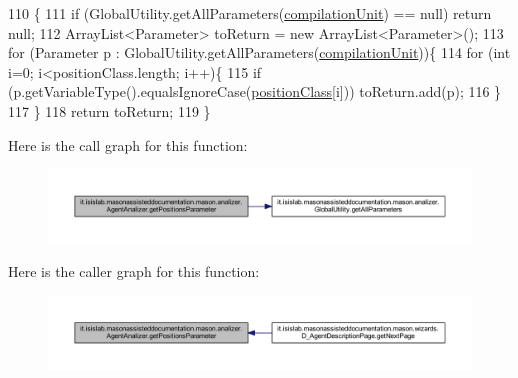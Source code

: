 \begin{DoxyCode}
110                                                        \{
111         \textcolor{keywordflow}{if} (GlobalUtility.getAllParameters(\hyperlink{classit_1_1isislab_1_1masonassisteddocumentation_1_1mason_1_1analizer_1_1_agent_analizer_aad9b5d0882694d2802dc24c982f21985}{compilationUnit}) == null) \textcolor{keywordflow}{return} null;
112         ArrayList<Parameter> toReturn = \textcolor{keyword}{new} ArrayList<Parameter>();
113         \textcolor{keywordflow}{for} (Parameter p : GlobalUtility.getAllParameters(\hyperlink{classit_1_1isislab_1_1masonassisteddocumentation_1_1mason_1_1analizer_1_1_agent_analizer_aad9b5d0882694d2802dc24c982f21985}{compilationUnit}))\{
114                 \textcolor{keywordflow}{for} (\textcolor{keywordtype}{int} i=0; i<positionClass.length; i++)\{
115                     \textcolor{keywordflow}{if} (p.getVariableType().equalsIgnoreCase(\hyperlink{classit_1_1isislab_1_1masonassisteddocumentation_1_1mason_1_1analizer_1_1_agent_analizer_aea5eff658e91428950dd0efd1339bf36}{positionClass}[i]))    
      toReturn.add(p);
116                 \}               
117         \}
118         \textcolor{keywordflow}{return} toReturn;
119     \}   
\end{DoxyCode}


Here is the call graph for this function\-:\nopagebreak
\begin{figure}[H]
\begin{center}
\leavevmode
\includegraphics[width=350pt]{classit_1_1isislab_1_1masonassisteddocumentation_1_1mason_1_1analizer_1_1_agent_analizer_a351c38491d7f706177c4c76478cabd6d_cgraph}
\end{center}
\end{figure}




Here is the caller graph for this function\-:\nopagebreak
\begin{figure}[H]
\begin{center}
\leavevmode
\includegraphics[width=350pt]{classit_1_1isislab_1_1masonassisteddocumentation_1_1mason_1_1analizer_1_1_agent_analizer_a351c38491d7f706177c4c76478cabd6d_icgraph}
\end{center}
\end{figure}


